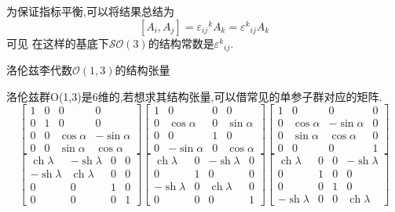 \documentclass[../main.tex]{subfiles}
\begin{document}
 为保证指标平衡,可以将结果总结为$$[A_i,A_j] = \varepsilon_{ij}{}^kA_k = \varepsilon ^k{}_{ij}A_k$$可见
 在这样的基底下$\mathscr{SO}(3)$的结构常数是$\varepsilon^k{}_{ij}$.
 \begin{example}
     洛伦兹李代数$\mathscr{O}(1,3)$的结构张量
 \end{example}
     洛伦兹群O(1,3)是6维的,若想求其结构张量,可以借常见的单参子群对应的矩阵.
     $$\begin{bmatrix}
     1 & 0 & 0 & 0 \\
     0 & 1 & 0 & 0 \\
     0 & 0 & \cos \alpha & -\sin \alpha \\
     0 & 0 & \sin \alpha & \cos \alpha
     \end{bmatrix}
     \begin{bmatrix}
     1 & 0 & 0 & 0 \\
     0 & \cos \alpha & 0 & \sin \alpha \\
     0 & 0 & 1 & 0 \\
     0 & -\sin \alpha & 0 & \cos \alpha
     \end{bmatrix}
     \begin{bmatrix}
     1 & 0 & 0 & 0 \\
     0 & \cos \alpha & -\sin \alpha & 0 \\
     0 & \sin \alpha & \cos \alpha & 0 \\
     0 & 0 & 0 & 1
     \end{bmatrix}$$
     $$\begin{bmatrix}
     \operatorname{ch} \lambda & -\operatorname{sh} \lambda & 0 & 0 \\
     -\operatorname{sh} \lambda & \operatorname{ch} \lambda & 0 & 0 \\
     0 & 0 & 1 & 0 \\
     0 & 0 & 0 & 1
     \end{bmatrix}
     \begin{bmatrix}
     \operatorname{ch} \lambda & 0 & -\operatorname{sh} \lambda & 0 \\
     0 & 1 & 0 & 0 \\
     -\operatorname{sh} \lambda & 0 & \operatorname{ch} \lambda & 0 \\
     0 & 0 & 0 & 1
     \end{bmatrix}
     \begin{bmatrix}
     \operatorname{ch} \lambda & 0 & 0 & -\operatorname{sh} \lambda \\
     0 & 1 & 0 & 0 \\
     0 & 0 & 1 & 0 \\
     -\operatorname{sh} \lambda & 0 & 0 & \operatorname{ch} \lambda
     \end{bmatrix}$$
\end{document}
